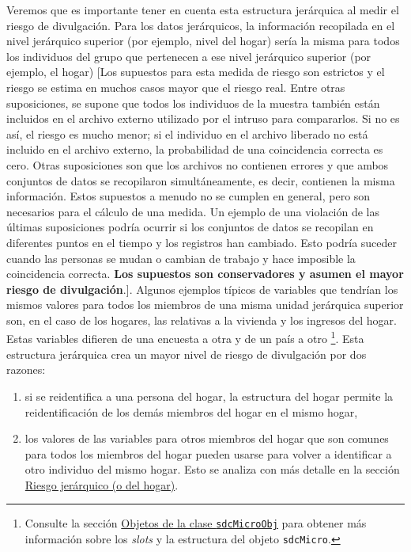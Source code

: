 \documentclass[]{book}
\theoremstyle{definition}
\theoremstyle{definition}
\theoremstyle{definition}
\theoremstyle{definition}
\theoremstyle{remark}
\begin{document}
Veremos que es importante tener en cuenta esta estructura jerárquica al medir el riesgo de divulgación. Para los datos jerárquicos, la información recopilada en el nivel jerárquico superior (por ejemplo, nivel del hogar) sería la misma para todos los individuos del grupo que pertenecen a ese nivel jerárquico superior (por ejemplo, el hogar) {[}Los supuestos para esta medida de riesgo son estrictos y el riesgo se estima en muchos casos mayor que el riesgo real. Entre otras suposiciones, se supone que todos los individuos de la muestra también están incluidos en el archivo externo utilizado por el intruso para compararlos. Si no es así, el riesgo es mucho menor; si el individuo en el archivo liberado no está incluido en el archivo externo, la probabilidad de una coincidencia correcta es cero. Otras suposiciones son que los archivos no contienen errores y que ambos conjuntos de datos se recopilaron simultáneamente, es decir, contienen la misma información. Estos supuestos a menudo no se cumplen en general, pero son necesarios para el cálculo de una medida. Un ejemplo de una violación de las últimas suposiciones podría ocurrir si los conjuntos de datos se recopilan en diferentes puntos en el tiempo y los registros han cambiado. Esto podría suceder cuando las personas se mudan o cambian de trabajo y hace imposible la coincidencia correcta. \textbf{Los supuestos son conservadores y asumen el mayor riesgo de divulgación}.{]}. Algunos ejemplos típicos de variables que tendrían los mismos valores para todos los miembros de una misma unidad jerárquica superior son, en el caso de los hogares, las relativas a la vivienda y los ingresos del hogar. Estas variables difieren de una encuesta a otra y de un país a otro \footnote{Consulte la sección \protect\hyperlink{objetos-de-la-clase-sdcmicroobj}{Objetos de la clase \texttt{sdcMicroObj}} para obtener más información sobre los \emph{slots} y la estructura del objeto \texttt{sdcMicro}.}. Esta estructura jerárquica crea un mayor nivel de riesgo de divulgación por dos razones:

\begin{enumerate}
\def\labelenumi{\arabic{enumi}.}
\item
  si se reidentifica a una persona del hogar, la estructura del hogar permite la reidentificación de los demás miembros del hogar en el mismo hogar,
\item
  los valores de las variables para otros miembros del hogar que son comunes para todos los miembros del hogar pueden usarse para volver a identificar a otro individuo del mismo hogar. Esto se analiza con más detalle en la sección \protect\hyperlink{riesgo-jeruxe1rquico-o-del-hogar}{Riesgo jerárquico (o del hogar)}.
\end{enumerate}
\end{document}
